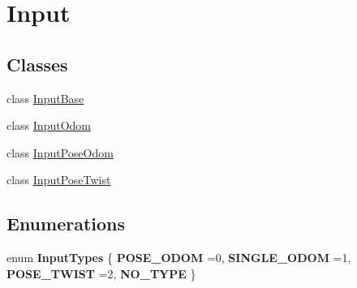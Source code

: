 \hypertarget{group__Input}{}\section{Input}
\label{group__Input}
\subsection*{Classes}
\begin{DoxyCompactItemize}
\item 
class \hyperlink{classInputBase}{Input\+Base}
\item 
class \hyperlink{classInputOdom}{Input\+Odom}
\item 
class \hyperlink{classInputPoseOdom}{Input\+Pose\+Odom}
\item 
class \hyperlink{classInputPoseTwist}{Input\+Pose\+Twist}
\end{DoxyCompactItemize}
\subsection*{Enumerations}
\begin{DoxyCompactItemize}
\item 
\mbox{\label{group__Input_gaf4789bd72e7b14daae9ed61dbc059261}} 
enum {\bfseries Input\+Types} \{ {\bfseries P\+O\+S\+E\+\_\+\+O\+D\+OM} =0, 
{\bfseries S\+I\+N\+G\+L\+E\+\_\+\+O\+D\+OM} =1, 
{\bfseries P\+O\+S\+E\+\_\+\+T\+W\+I\+ST} =2, 
{\bfseries N\+O\+\_\+\+T\+Y\+PE}
 \}
\end{DoxyCompactItemize}
